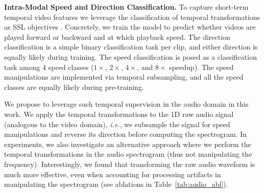 \documentclass[letterpaper]{article} %
\newcommand{\ie}{\emph{i.e.}}
\begin{document}
\noindent \textbf{Intra-Modal Speed and Direction Classification.}
To capture short-term temporal video features we leverage the classification of temporal transformations as SSL objectives \cite{jenni2020video}. 
Concretely, we train the model to predict whether videos are played forward or backward and at which playback speed.
The direction classification is a simple binary classification task per clip, and either direction is equally likely during training. 
The speed classification is posed as a classification task among 4 speed classes ($1\times$, $2\times$, $4\times$, and $8\times$ speedup). The speed manipulations are implemented via temporal subsampling, and all the speed classes are equally likely during pre-training. 

We propose to leverage such temporal supervision in the audio domain in this work. 
We apply the temporal transformations to the 1D raw audio signal (analogous to the video domain), \ie, we subsample the signal for speed manipulations and reverse its direction before computing the spectrogram. 
In experiments, we also investigate an alternative approach where we perform the temporal transformations in the audio spectrogram (thus not manipulating the frequency). Interestingly, we found that transforming the raw audio waveform is much more effective, even when accounting for processing artifacts in manipulating the spectrogram (see ablations in Table~\ref{tab:audio_abl}). 

\end{document}

